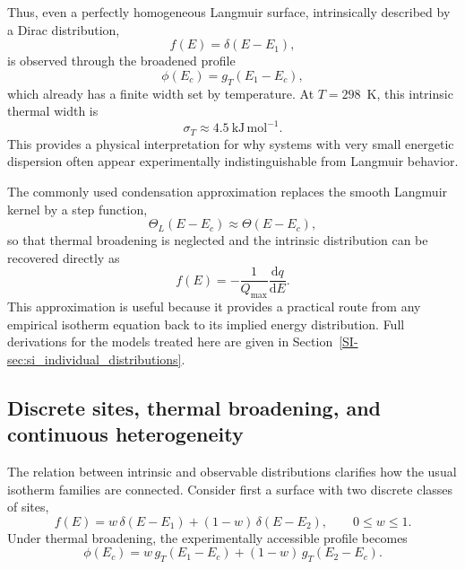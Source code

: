 \documentclass[journal=jacsat,manuscript=article]{achemso}
\begin{document}
	Thus, even a perfectly homogeneous Langmuir surface, intrinsically described by a Dirac distribution,
	\begin{equation}
		f(E) = \delta(E-E_1),
		\label{eq:delta_langmuir}
	\end{equation}
	is observed through the broadened profile
	\begin{equation}
		\phi(E_c) = g_T(E_1-E_c),
		\label{eq:single_site_broadened}
	\end{equation}
	which already has a finite width set by temperature. At $T=298$~K, this intrinsic thermal width is
	\begin{equation}
		\sigma_T \approx 4.5~\mathrm{kJ\,mol^{-1}}.
	\end{equation}
	This provides a physical interpretation for why systems with very small energetic dispersion often appear experimentally indistinguishable from Langmuir behavior.
	
	The commonly used condensation approximation replaces the smooth Langmuir kernel by a step function,
	\begin{equation}
		\Theta_L(E-E_c) \approx \Theta(E-E_c),
		\label{eq:condensation_step}
	\end{equation}
	so that thermal broadening is neglected and the intrinsic distribution can be recovered directly as
	\begin{equation}
		f(E)
		=
		-\frac{1}{Q_{\max}}\frac{\mathrm{d}q}{\mathrm{d}E}.
		\label{eq:fE_general}
	\end{equation}
	This approximation is useful because it provides a practical route from any empirical isotherm equation back to its implied energy distribution. Full derivations for the models treated here are given in Section~\ref{SI-sec:si_individual_distributions}.
	
	\subsection{Discrete sites, thermal broadening, and continuous heterogeneity}
	\label{sec:energy_examples}
	
	The relation between intrinsic and observable distributions clarifies how the usual isotherm families are connected. Consider first a surface with two discrete classes of sites,
	\begin{equation}
		f(E)
		=
		w\,\delta(E-E_1)
		+
		(1-w)\,\delta(E-E_2),
		\qquad 0 \leq w \leq 1.
		\label{eq:two_site_distribution}
	\end{equation}
	Under thermal broadening, the experimentally accessible profile becomes
	\begin{equation}
		\phi(E_c)
		=
		w\, g_T(E_1-E_c)
		+
		(1-w)\, g_T(E_2-E_c).
		\label{eq:two_site_broadened}
	\end{equation}
	
\end{document}
